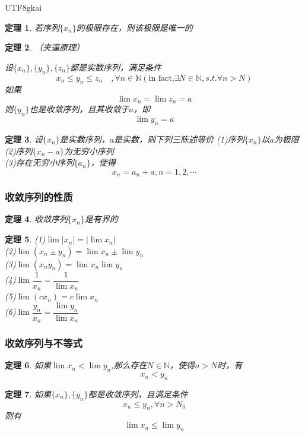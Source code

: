 \documentclass{article}
\newtheorem{theorem}{定理}[subsection]
\begin{document}
\begin{CJK}{UTF8}{gkai}
\begin{theorem}
若序列$\{x_n\}$的极限存在，则该极限是唯一的\\
\end{theorem}

\begin{theorem}（夹逼原理）

设$\{x_n\},\{y_n\},\{z_n\}$都是实数序列，满足条件
\[x_n\leq y_n\leq z_n\quad, \forall n\in \mathbb{N}(\text{in fact,} \exists N\in \mathbb{N},s.t. \forall n >N)\]
如果\[\lim x_n=\lim z_n=a\]
则$\{y_n\}$也是收敛序列，且其收敛于$a$，即
\[\lim_{} y_n = a\]
\end{theorem}

\begin{theorem}
设$\{x_n\}$是实数序列，$a$是实数，则下列三陈述等价
(1)序列$\{x_n\}$以$a$为极限\\
(2)序列$\{x_n-a\}$为无穷小序列\\
(3)存在无穷小序列$\{a_n\}$，使得
\[x_n=a_n+a,n=1,2,\cdots\]
\end{theorem}
\subsubsection{收敛序列的性质}
\begin{theorem}
收敛序列$\{x_n\}$是有界的\\
\end{theorem}
\begin{theorem}
(1)$\lim |x_n|=|\lim x_n|$\\
(2)$\lim(x_n\pm y_n)=\lim x_n \pm \lim y_n$\\
(3)$\lim(x_n y_n)=\lim x_n  \lim y_n$\\
(4)$\lim\dfrac{1}{x_n}=\dfrac{1}{\lim x_n}$\\
(5)$\lim(c x_n)=c\lim x_n$\\
(6)$\lim\dfrac{y_n}{x_n}=\dfrac{\lim y_n}{\lim x_n}$\\
\end{theorem}
\subsubsection{收敛序列与不等式}
\begin{theorem}

如果$\lim x_n <\lim y_n$,那么存在$N\in \mathbb{N}$，使得$n > N$时，有\\
\[x_n < y_n\]
\end{theorem}

\begin{theorem}
如果$\{x_n\},\{y_n\}$都是收敛序列，且满足条件
\[x_n \leq y_n ,\forall n > N_0\]
则有
\[\lim x_n \leq \lim y_n\]
\end{theorem}

\end{CJK}
\end{document}
